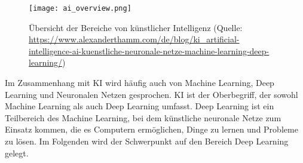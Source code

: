\begin{figure}[h]
	\centering
	\texttt{[image: ai\_overview.png]}
	\caption{Übersicht der Bereiche von künstlicher Intelligenz (Quelle: \url{https://www.alexanderthamm.com/de/blog/ki_artificial-intelligence-ai-kuenstliche-neuronale-netze-machine-learning-deep-learning/})}
\end{figure}

Im Zusammenhang mit \ac{KI} wird häufig auch von Machine Learning, Deep Learning und Neuronalen Netzen gesprochen. \ac{KI} ist der Oberbegriff, der sowohl Machine Learning als auch Deep Learning umfasst. Deep Learning ist ein Teilbereich des Machine Learning, bei dem künstliche neuronale Netze zum Einsatz kommen, die es Computern ermöglichen, Dinge zu lernen und Probleme zu lösen. Im Folgenden wird der Schwerpunkt auf den Bereich Deep Learning gelegt.